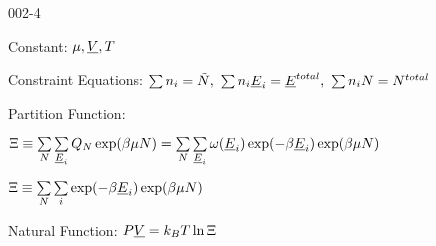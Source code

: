 \begin{mitframe}{002-4} %

    
\begin{listone}
    
    \item Constant: $\chempot, \uline{\vol}, \Temp$

    \item Constraint Equations: $\sum\nolimits \molspecies{i} = \totmoles, ~\sum\nolimits \molspecies{i}\uline{\energy}_{i} = \uline{\energy}^{total},~\sum\nolimits \molspecies{i}\nummoles = \nummoles^{total}  $     %
    
    \item Partition Function:
    
    \begin{listtwo}
        
    	\item $\gcpf \equiv \sum\limits_{\nummoles}\sum\limits_{\uline{\energy}_{i}} \cpf\exp(\boltznorm\chempot\nummoles) = \sum\limits_{\nummoles}\sum\limits_{\uline{\energy}_{i}} \mpf(\uline{\energy}_{i})\exp(-\boltznorm\uline{\energy}_{i})\exp(\boltznorm\chempot\nummoles) $
    
    	\item $\gcpf \equiv \sum\limits_{\nummoles}\sum\limits_{i} \exp(-\boltznorm\uline{\energy}_{i})\exp(\boltznorm\chempot\nummoles) $
    
    \end{listtwo}
    
    \medskip       
    
    \item Natural Function: $\p\uline{\vol} = \boltz\Temp\ln\gcpf$
    
    
\end{listone}
    
\end{mitframe}
